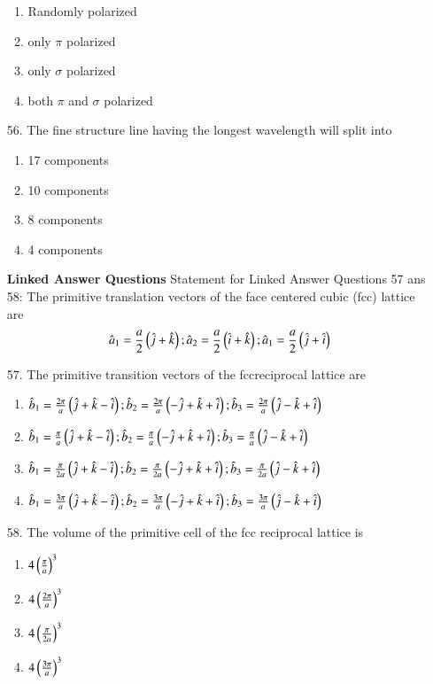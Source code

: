 \documentclass[journal]{IEEEtran}
\begin{document}
\begin{enumerate}
\begin{enumerate}[label=(\Alph*)]
        \item Randomly polarized
        \item only $\pi$ polarized
        \item only $\sigma$ polarized
        \item both $\pi$ and $\sigma$ polarized
     \end{enumerate}
     \item[56.]  The fine structure line having the longest wavelength will split into
     \begin{enumerate}[label=(\Alph*)]
        \item  17 components
        \item  10 components
        \item  8 components
        \item  4 components
     \end{enumerate}
     \textbf{Linked Answer Questions}
     Statement for Linked Answer Questions 57 ans 58:
    The primitive translation vectors of the face centered cubic (fcc) lattice are 
    $$\hat{a}_1 = \frac{a}{2}\left(\hat{j}+\hat{k}\right);\hat{a}_2 = \frac{a}{2}\left(\hat{i}+\hat{k}\right);\hat{a}_1 = \frac{a}{2}\left(\hat{j}+\hat{i}\right)$$
    \item[57.] The primitive transition vectors of the fccreciprocal lattice are 
    \begin{enumerate}[label=(\Alph*)]
        \item $\hat{b}_1 = \frac{2\pi}{a}\left(\hat{j}+\hat{k}-\hat{i}\right);\hat{b}_2 = \frac{2\pi}{a}\left(-\hat{j}+\hat{k}+\hat{i}\right);\hat{b}_3 = \frac{2\pi}{a}\left(\hat{j}-\hat{k}+\hat{i}\right)$
        \item $\hat{b}_1 = \frac{\pi}{a}\left(\hat{j}+\hat{k}-\hat{i}\right);\hat{b}_2 = \frac{\pi}{a}\left(-\hat{j}+\hat{k}+\hat{i}\right);\hat{b}_3 = \frac{\pi}{a}\left(\hat{j}-\hat{k}+\hat{i}\right)$
        \item $\hat{b}_1 = \frac{\pi}{2a}\left(\hat{j}+\hat{k}-\hat{i}\right);\hat{b}_2 = \frac{\pi}{2a}\left(-\hat{j}+\hat{k}+\hat{i}\right);\hat{b}_3 = \frac{\pi}{2a}\left(\hat{j}-\hat{k}+\hat{i}\right)$
        \item $\hat{b}_1 = \frac{3\pi}{a}\left(\hat{j}+\hat{k}-\hat{i}\right);\hat{b}_2 = \frac{3\pi}{a}\left(-\hat{j}+\hat{k}+\hat{i}\right);\hat{b}_3 = \frac{3\pi}{a}\left(\hat{j}-\hat{k}+\hat{i}\right)$
    \end{enumerate}
    \item[58.] The volume of the primitive cell of the fcc reciprocal lattice is
    \begin{enumerate}[label=(\Alph*)]
        \item $4\left(\frac{\pi}{a}\right)^3$
        \item $4\left(\frac{2\pi}{a}\right)^3$
        \item $4\left(\frac{\pi}{2a}\right)^3$
        \item $4\left(\frac{3\pi}{a}\right)^3$
    \end{enumerate}
    

\end{enumerate}
\end{document}
